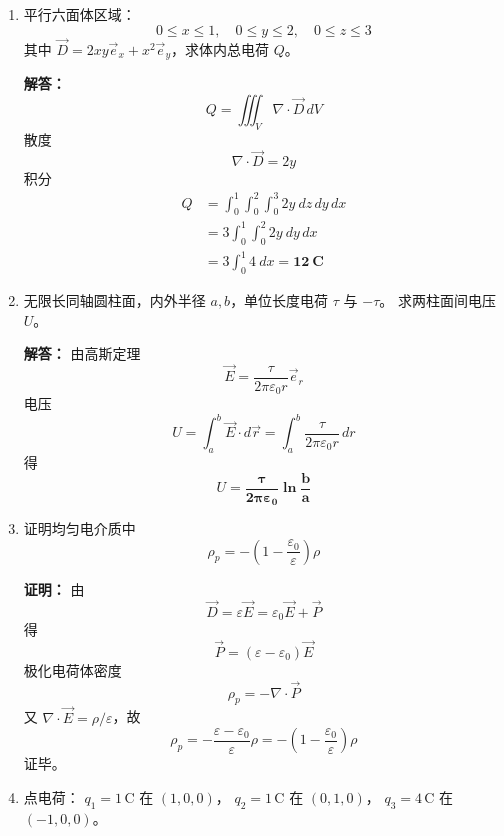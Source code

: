 \begin{enumerate}[label=\arabic*.]
\vspace{1em}

\item 平行六面体区域：
\[
0\le x\le1,\quad 0\le y\le2,\quad 0\le z\le3
\]
其中 \(\vec{D}=2xy\vec{e}_x+x^2\vec{e}_y\)，求体内总电荷 \(Q\)。

\textbf{解答：}
\[
Q=\iiint_V \nabla\cdot\vec{D}\,dV
\]
散度
\[
\nabla\cdot\vec{D}=2y
\]
积分
\[
\begin{aligned}
Q&=\int_0^1\int_0^2\int_0^3 2y\ dz\,dy\,dx\\
&= 3\int_0^1\int_0^2 2y\ dy\,dx\\
&= 3\int_0^1 4\ dx = \boldsymbol{12\ \text{C}}
\end{aligned}
\]

\vspace{1em}

\item 无限长同轴圆柱面，内外半径 \(a,b\)，单位长度电荷 \(\tau\) 与 \(-\tau\)。
求两柱面间电压 \(U\)。

\textbf{解答：}
由高斯定理
\[
\vec{E}=\frac{\tau}{2\pi\varepsilon_0 r}\vec{e}_r
\]
电压
\[
U=\int_a^b \vec{E}\cdot d\vec{r}
=\int_a^b \frac{\tau}{2\pi\varepsilon_0 r}\,dr
\]
得
\[
U=\boldsymbol{\frac{\tau}{2\pi\varepsilon_0}\ln\frac{b}{a}}
\]

\vspace{1em}

\item 证明均匀电介质中
\[
\rho_p=-\left(1-\frac{\varepsilon_0}{\varepsilon}\right)\rho
\]

\textbf{证明：}
由
\[
\vec{D}=\varepsilon\vec{E}=\varepsilon_0\vec{E}+\vec{P}
\]
得
\[
\vec{P}=(\varepsilon-\varepsilon_0)\vec{E}
\]
极化电荷体密度
\[
\rho_p=-\nabla\cdot\vec{P}
\]
又 \(\nabla\cdot\vec{E}=\rho/\varepsilon\)，故
\[
\rho_p= -\frac{\varepsilon-\varepsilon_0}{\varepsilon}\rho
= -\left(1-\frac{\varepsilon_0}{\varepsilon}\right)\rho
\]
证毕。

\vspace{1em}

\item 点电荷：
\(q_1=1\,\text{C}\) 在 \((1,0,0)\)，
\(q_2=1\,\text{C}\) 在 \((0,1,0)\)，
\(q_3=4\,\text{C}\) 在 \((-1,0,0)\)。


\end{enumerate}
